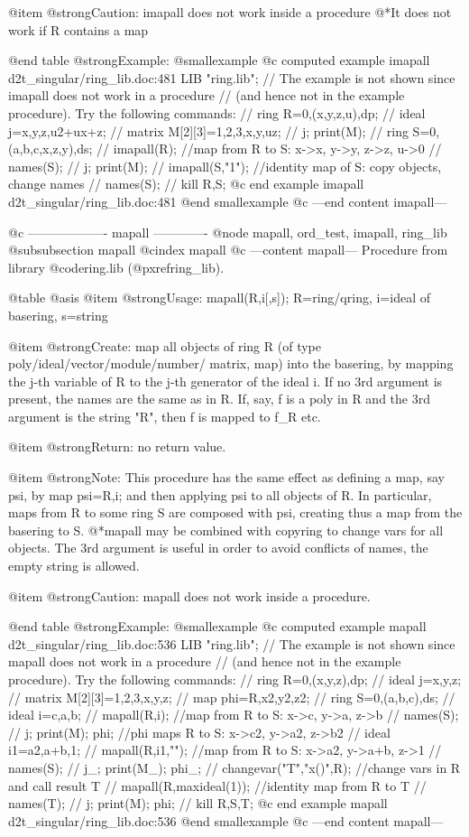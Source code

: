 @item @strong{Caution:}
imapall does not work inside a procedure
@*It does not work if R contains a map

@end table
@strong{Example:}
@smallexample
@c computed example imapall d2t_singular/ring_lib.doc:481 
LIB "ring.lib";
// The example is not shown since imapall does not work in a procedure
// (and hence not in the example procedure). Try the following commands:
//   ring R=0,(x,y,z,u),dp;
//   ideal j=x,y,z,u2+ux+z;
//   matrix M[2][3]=1,2,3,x,y,uz;
//   j; print(M);
//   ring S=0,(a,b,c,x,z,y),ds;
//   imapall(R);         //map from R to S: x->x, y->y, z->z, u->0
//   names(S);
//   j; print(M);
//   imapall(S,"1");     //identity map of S: copy objects, change names
//   names(S);
//   kill R,S;
@c end example imapall d2t_singular/ring_lib.doc:481
@end smallexample
@c ---end content imapall---

@c ------------------- mapall -------------
@node mapall, ord_test, imapall, ring_lib
@subsubsection mapall
@cindex mapall
@c ---content mapall---
Procedure from library @code{ring.lib} (@pxref{ring_lib}).

@table @asis
@item @strong{Usage:}
mapall(R,i[,s]); R=ring/qring, i=ideal of basering, s=string

@item @strong{Create:}
map all objects of ring R (of type poly/ideal/vector/module/number/
matrix, map) into the basering, by mapping the j-th variable of R to
the j-th generator of the ideal i. If no 3rd argument is present, the
names are the same as in R. If, say, f is a poly in R and the 3rd
argument is the string "R", then f is mapped to f_R etc.

@item @strong{Return:}
no return value.

@item @strong{Note:}
This procedure has the same effect as defining a map, say psi, by
map psi=R,i; and then applying psi to all objects of R. In particular,
maps from R to some ring S are composed with psi, creating thus a map
from the basering to S.
@*mapall may be combined with copyring to change vars for all objects.
The 3rd argument is useful in order to avoid conflicts of names, the
empty string is allowed.

@item @strong{Caution:}
mapall does not work inside a procedure.

@end table
@strong{Example:}
@smallexample
@c computed example mapall d2t_singular/ring_lib.doc:536 
LIB "ring.lib";
// The example is not shown since mapall does not work in a procedure
// (and hence not in the example procedure). Try the following commands:
//   ring R=0,(x,y,z),dp;
//   ideal j=x,y,z;
//   matrix M[2][3]=1,2,3,x,y,z;
//   map phi=R,x2,y2,z2;
//   ring S=0,(a,b,c),ds;
//   ideal i=c,a,b;
//   mapall(R,i);         //map from R to S: x->c, y->a, z->b
//   names(S);
//   j; print(M); phi;    //phi maps R to S: x->c2, y->a2, z->b2
//   ideal i1=a2,a+b,1;
//   mapall(R,i1,"");   //map from R to S: x->a2, y->a+b, z->1
//   names(S);
//   j_; print(M_); phi_;
//   changevar("T","x()",R);  //change vars in R and call result T
//   mapall(R,maxideal(1));       //identity map from R to T
//   names(T);
//   j; print(M); phi;
//   kill R,S,T;
@c end example mapall d2t_singular/ring_lib.doc:536
@end smallexample
@c ---end content mapall---

